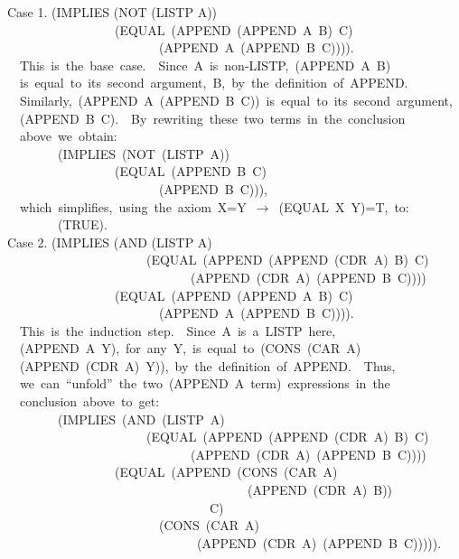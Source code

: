 \documentclass[10pt]{book}
\newenvironment{pubasis}{\begin{flushleft}}{\end{flushleft}}
\begin{document}
\begin{pubasis}
Case 1.	(IMPLIES (NOT (LISTP A))\\
~~~~~~~~~~~~~~~~~(EQUAL~(APPEND~(APPEND~A~B)~C)\\
~~~~~~~~~~~~~~~~~~~~~~~~(APPEND~A~(APPEND~B~C)))).\\

~~This~is~the~base~case.~~Since~A~is~non-LISTP,~(APPEND~A~B)\\
~~is~equal~to~its~second~argument,~B,~by~the~definition~of~APPEND.\\
~~Similarly,~(APPEND~A~(APPEND~B~C))~is~equal~to~its~second~argument,\\
~~(APPEND~B~C).~~By~rewriting~these~two~terms~in~the~conclusion\\
~~above~we~obtain:\\

~~~~~~~~(IMPLIES~(NOT~(LISTP~A))\\
~~~~~~~~~~~~~~~~~(EQUAL~(APPEND~B~C)\\
~~~~~~~~~~~~~~~~~~~~~~~~(APPEND~B~C))),\\

~~which~simplifies,~using~the~axiom~X=Y~$\rightarrow$~(EQUAL~X~Y)=T,~to:\\

~~~~~~~~(TRUE).\\

Case 2.	(IMPLIES (AND (LISTP A)\\
~~~~~~~~~~~~~~~~~~~~~~(EQUAL~(APPEND~(APPEND~(CDR~A)~B)~C)\\
~~~~~~~~~~~~~~~~~~~~~~~~~~~~~(APPEND~(CDR~A)~(APPEND~B~C))))\\
~~~~~~~~~~~~~~~~~(EQUAL~(APPEND~(APPEND~A~B)~C)\\
~~~~~~~~~~~~~~~~~~~~~~~~(APPEND~A~(APPEND~B~C)))).\\

~~This~is~the~induction~step.~~Since~A~is~a~LISTP~here,\\
~~(APPEND~A~Y),~for~any~Y,~is~equal~to~(CONS~(CAR~A)\\
~~(APPEND~(CDR~A)~Y)),~by~the~definition~of~APPEND.~~Thus,\\
~~we~can~``unfold''~the~two~(APPEND~A~term)~expressions~in~the\\
~~conclusion~above~to~get:\\

~~~~~~~~(IMPLIES~(AND~(LISTP~A)\\
~~~~~~~~~~~~~~~~~~~~~~(EQUAL~(APPEND~(APPEND~(CDR~A)~B)~C)\\
~~~~~~~~~~~~~~~~~~~~~~~~~~~~~(APPEND~(CDR~A)~(APPEND~B~C))))\\
~~~~~~~~~~~~~~~~~(EQUAL~(APPEND~(CONS~(CAR~A)\\
~~~~~~~~~~~~~~~~~~~~~~~~~~~~~~~~~~~~~~(APPEND~(CDR~A)~B))\\
~~~~~~~~~~~~~~~~~~~~~~~~~~~~~~~~C)\\
~~~~~~~~~~~~~~~~~~~~~~~~(CONS~(CAR~A)\\
~~~~~~~~~~~~~~~~~~~~~~~~~~~~~~(APPEND~(CDR~A)~(APPEND~B~C))))).\\


\end{pubasis}
\end{document}

